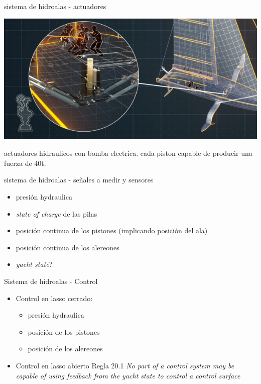 \documentclass[presentation,aspectratio=169]{beamer}
\begin{document}
\begin{frame}[label={sec:org9561a43}]{sistema de hidroalas - actuadores}

\begin{center}
\includegraphics[height=0.4\textheight]{../../figures/ac75-actuators.png}
\end{center}

actuadores hidraulicos con bomba electrica. cada piston capable de producir una fuerza de 40t.
\end{frame}

\begin{frame}[label={sec:org0a4813e}]{sistema de hidroalas - señales a medir y sensores}
\begin{itemize}
\item presión hydraulica
\item \emph{state of charge} de las pilas
\item posición continua de los pistones (implicando posición del ala)
\item posición continua de los alereones
\item \emph{yacht state}?
\end{itemize}
\end{frame}



\begin{frame}[label={sec:orgaaa2892}]{Sistema de hidroalas - Control}
\begin{itemize}
\item Control en \alert{lasso cerrado}:
\begin{itemize}
\item presión hydraulica
\item posición de los pistones
\item posición de los alereones
\end{itemize}
\item Control en \alert{lasso abierto} Regla 20.1 \emph{No part of a control system may be capable of using feedback from the yacht state to control a control surface}
\end{itemize}
\end{frame}
\end{document}
